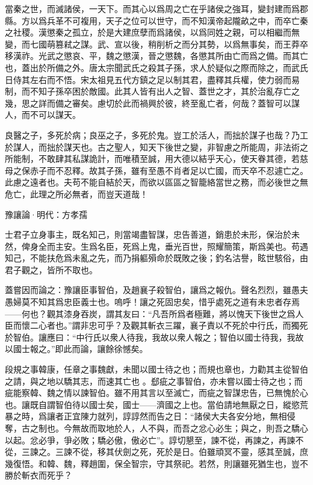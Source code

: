 \documentclass[12pt,a4paper]{ctexbook}
\begin{document}
當秦之世，而滅諸侯，一天下。而其心以爲周之亡在乎諸侯之強耳，變封建而爲郡縣。方以爲兵革不可複用，天子之位可以世守，而不知漢帝起隴畝之中，而卒亡秦之社稷。漢懲秦之孤立，於是大建庶孽而爲諸侯，以爲同姓之親，可以相繼而無變，而七國萌篡弒之謀。武、宣以後，稍削析之而分其勢，以爲無事矣，而王莽卒移漢祚。光武之懲哀、平，魏之懲漢，晉之懲魏，各懲其所由亡而爲之備。而其亡也，蓋出於所備之外。唐太宗聞武氏之殺其子孫，求人於疑似之際而除之，而武氏日侍其左右而不悟。宋太祖見五代方鎮之足以制其君，盡釋其兵權，使力弱而易制，而不知子孫卒困於敵國。此其人皆有出人之智、蓋世之才，其於治亂存亡之幾，思之詳而備之審矣。慮切於此而禍興於彼，終至亂亡者，何哉？蓋智可以謀人，而不可以謀天。\par
良醫之子，多死於病；良巫之子，多死於鬼。豈工於活人，而拙於謀子也哉？乃工於謀人，而拙於謀天也。古之聖人，知天下後世之變，非智慮之所能周，非法術之所能制，不敢肆其私謀詭計，而唯積至誠，用大德以結乎天心，使天眷其德，若慈母之保赤子而不忍釋。故其子孫，雖有至愚不肖者足以亡國，而天卒不忍遽亡之。此慮之遠者也。夫苟不能自結於天，而欲以區區之智籠絡當世之務，而必後世之無危亡，此理之所必無者，而豈天道哉！\par
豫讓論·明代：方孝孺 \par
士君子立身事主，既名知己，則當竭盡智謀，忠告善道，銷患於未形，保治於未然，俾身全而主安。生爲名臣，死爲上鬼，垂光百世，照耀簡策，斯爲美也。苟遇知己，不能扶危爲未亂之先，而乃捐軀殞命於既敗之後；釣名沽譽，眩世駭俗，由君子觀之，皆所不取也。\par
蓋嘗因而論之：豫讓臣事智伯，及趙襄子殺智伯，讓爲之報仇。聲名烈烈，雖愚夫愚婦莫不知其爲忠臣義士也。嗚呼！讓之死固忠矣，惜乎處死之道有未忠者存焉——何也？觀其漆身吞炭，謂其友曰：“凡吾所爲者極難，將以愧天下後世之爲人臣而懷二心者也。”謂非忠可乎？及觀其斬衣三躍，襄子責以不死於中行氏，而獨死於智伯。讓應曰：“中行氏以衆人待我，我故以衆人報之；智伯以國士待我，我故以國士報之。”即此而論，讓餘徐憾矣。\par
段規之事韓康，任章之事魏獻，未聞以國士待之也；而規也章也，力勸其主從智伯之請，與之地以驕其志，而速其亡也 。郄疵之事智伯，亦未嘗以國士待之也；而疵能察韓、魏之情以諫智伯。雖不用其言以至滅亡，而疵之智謀忠告，已無愧於心也。讓既自謂智伯待以國士矣，國士——濟國之上也。當伯請地無厭之日，縱慾荒暴之時，爲讓者正宜陳力就列，諄諄然而告之日：“諸侯大夫各安分地，無相侵奪，古之制也。今無故而取地於人，人不與，而吾之忿心必生；與之，則吾之驕心以起。忿必爭，爭必敗；驕必傲，傲必亡”。諄切懇至，諫不從，再諫之，再諫不從，三諫之。三諫不從，移其伏劍之死，死於是日。伯雖頑冥不靈，感其至誠，庶幾復悟。和韓、魏，釋趙圍，保全智宗，守其祭祀。若然，則讓雖死猶生也，豈不勝於斬衣而死乎？\par
\end{document}
